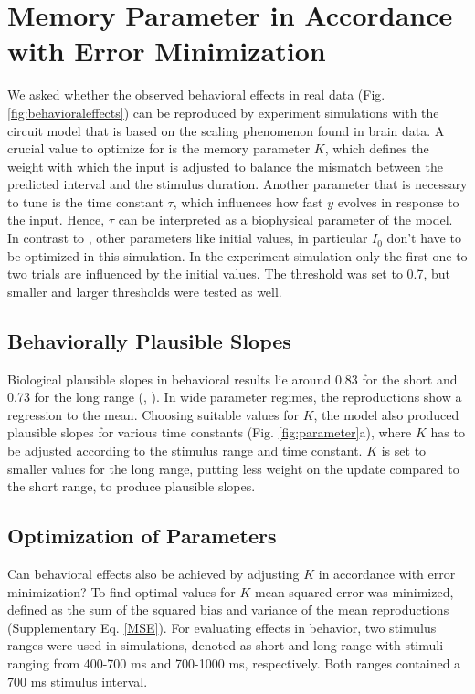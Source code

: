 \documentclass[10pt]{article}
\begin{document}
\section{Memory Parameter in Accordance with Error Minimization}
We asked whether the observed behavioral effects in real data (Fig. \ref{fig:behavioraleffects}) can be reproduced by experiment simulations with the circuit model that is based on the scaling phenomenon found in brain data. 
A crucial value to optimize for is the memory parameter $K$, which defines the weight with which the input is adjusted to balance the mismatch between the predicted interval and the stimulus duration.
Another parameter that is necessary to tune is the time constant $\tau$, which influences how fast $y$ evolves in response to the input. Hence, $\tau$ can be interpreted as a biophysical parameter of the model.
In contrast to \cite{Egger2019}, other parameters like initial values, in particular $I_0$ don't have to be optimized in this simulation. In the experiment simulation only the first one to two trials are influenced by the initial values.
The threshold was set to 0.7, but smaller and larger thresholds were tested as well.

 
\subsection{Behaviorally Plausible Slopes}
Biological plausible slopes in behavioral results lie around 0.83 for the short and 0.73 for the long range (\cite{Thurley2018}, \cite{Jazayeri2010}). 
In wide parameter regimes, the reproductions show a regression to the mean.
Choosing suitable values for $K$, the model also produced plausible slopes for various time constants (Fig. \ref{fig:parameter}a), where $K$ has to be adjusted according to the stimulus range and time constant. 
$K$ is set to smaller values for the long range, putting less weight on the update compared to the short range, to produce plausible slopes.

\subsection{Optimization of Parameters}
Can behavioral effects also be achieved by adjusting $K$ in accordance with error minimization?
To find optimal values for $K$ mean squared error was minimized, defined as the sum of the squared bias and variance of the mean reproductions (Supplementary Eq. \ref{MSE}).
For evaluating effects in behavior, two stimulus ranges were used in simulations, denoted as short and long range with stimuli ranging from 400-700 ms and 700-1000 ms, respectively. Both ranges contained a 700 ms stimulus interval.
\end{document}
